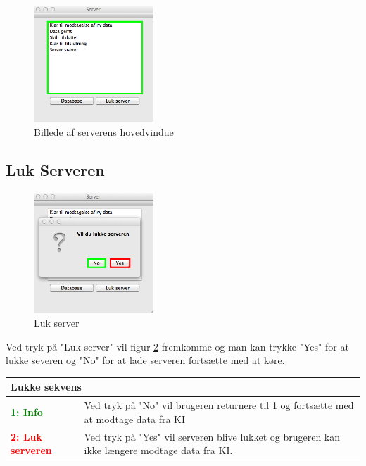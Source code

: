 \begin{figure}[htbp]
	\centering
	\includegraphics[width=0.4\textwidth]{billeder/database/server_on}
	\caption{Billede af serverens hovedvindue}
	\label{fig:server_on}
\end{figure}


\subsection*{Luk Serveren}
\begin{figure}[H]
	\centering
	\includegraphics[width=0.4\textwidth]{billeder/database/databaseLogOff}
	\caption{Luk server}
	\label{fig:databselLogOff}
\end{figure}
Ved tryk på "Luk server" vil figur \ref{fig:databselLogOff} fremkomme og man kan trykke "Yes" for at lukke severen og "No" for at lade serveren fortsætte med at køre.

\begin{table}[H]
\begin{tabular}{l p{12.5cm}}
\multicolumn{2}{l}{Lukke sekvens} \\
\hline
\textcolor{green}{\textbf{1: Info}}
&Ved tryk på "No" vil brugeren returnere til \ref{fig:server_on} og fortsætte med at modtage data fra KI\\

\textcolor{red}{\textbf{2: Luk serveren}}
&Ved tryk på "Yes" vil serveren blive lukket og brugeren kan ikke længere modtage data fra KI.\\

\end{tabular}
\end{table}


